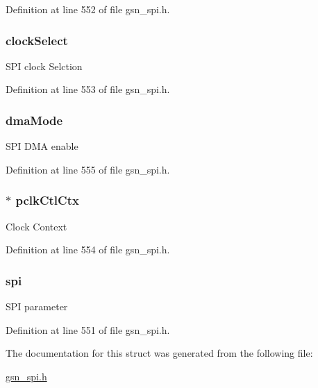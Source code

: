 Definition at line 552 of file gsn\_\-spi.h.

\hypertarget{a00238_af879184c3660e99b8402d538c035fbc5}{
\subsubsection[{clockSelect}]{ {\bf clockSelect}}}
\label{a00238_af879184c3660e99b8402d538c035fbc5}
SPI clock Selction 

Definition at line 553 of file gsn\_\-spi.h.

\hypertarget{a00238_a8745e343cad523631d63304871d0bdf3}{
\subsubsection[{dmaMode}]{ {\bf dmaMode}}}
\label{a00238_a8745e343cad523631d63304871d0bdf3}
SPI DMA enable 

Definition at line 555 of file gsn\_\-spi.h.

\hypertarget{a00238_a87fd9dda5636bd71a412693b96fed177}{
\subsubsection[{pclkCtlCtx}]{$\ast$ {\bf pclkCtlCtx}}}
\label{a00238_a87fd9dda5636bd71a412693b96fed177}
Clock Context 

Definition at line 554 of file gsn\_\-spi.h.

\hypertarget{a00238_abd539806732464e2493fd896b7539a56}{
\subsubsection[{spi}]{ {\bf spi}}}
\label{a00238_abd539806732464e2493fd896b7539a56}
SPI parameter 

Definition at line 551 of file gsn\_\-spi.h.



The documentation for this struct was generated from the following file:\begin{DoxyCompactItemize}
\item 
\hyperlink{a00587}{gsn\_\-spi.h}\end{DoxyCompactItemize}
